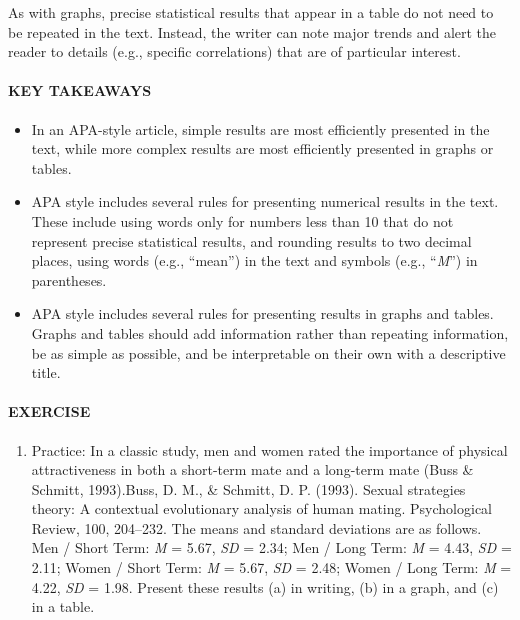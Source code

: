 \documentclass[
]{krantz}
\providecommand{\tightlist}{%
  \setlength{\itemsep}{0pt}\setlength{\parskip}{0pt}}
\begin{document}
As with graphs, precise statistical results that appear in a table do not need to be repeated in the text. Instead, the writer can note major trends and alert the reader to details (e.g., specific correlations) that are of particular interest.

\paragraph*{KEY TAKEAWAYS}\label{key-takeaways-34}

\begin{itemize}
\tightlist
\item
  In an APA-style article, simple results are most efficiently presented in the text, while more complex results are most efficiently presented in graphs or tables.
\item
  APA style includes several rules for presenting numerical results in the text. These include using words only for numbers less than 10 that do not represent precise statistical results, and rounding results to two decimal places, using words (e.g., ``mean'') in the text and symbols (e.g., ``\emph{M}'') in parentheses.
\item
  APA style includes several rules for presenting results in graphs and tables. Graphs and tables should add information rather than repeating information, be as simple as possible, and be interpretable on their own with a descriptive title.
\end{itemize}

\paragraph*{EXERCISE}\label{exercise-7}

\begin{enumerate}
\def\labelenumi{\arabic{enumi}.}
\tightlist
\item
  Practice: In a classic study, men and women rated the importance of physical attractiveness in both a short-term mate and a long-term mate (Buss \& Schmitt, 1993).Buss, D. M., \& Schmitt, D. P. (1993). Sexual strategies theory: A contextual evolutionary analysis of human mating. Psychological Review, 100, 204--232. The means and standard deviations are as follows. Men / Short Term: \emph{M} = 5.67, \emph{SD} = 2.34; Men / Long Term: \emph{M} = 4.43, \emph{SD} = 2.11; Women / Short Term: \emph{M} = 5.67, \emph{SD} = 2.48; Women / Long Term: \emph{M} = 4.22, \emph{SD} = 1.98. Present these results (a) in writing, (b) in a graph, and (c) in a table.
\end{enumerate}
\end{document}

